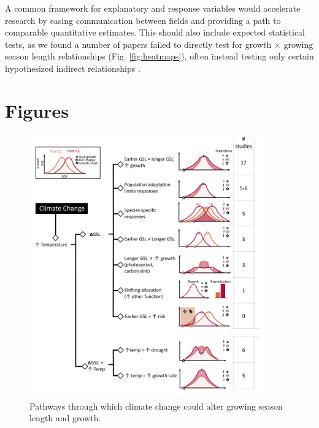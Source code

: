 \documentclass[11pt]{article}
\begin{document}
A common framework for explanatory and response variables would accelerate research by easing communication between fields and providing a path to comparable quantitative estimates. This should also include expected statistical tests, as we found a number of papers failed to directly test for growth $\times$ growing season length relationships (Fig. \ref{fig:heatmaps}), often instead testing only certain hypothesized indirect relationships \citep[e.g. spring temperature $\times$ growth in][]{dow2022warm}. %

\newpage
\section{Figures}


\clearpage
\begin{figure}[h!]
\includegraphics[width=0.9\textwidth]{..//figures/hypothesesconceptfig.png}
\caption{Pathways through which climate change could alter growing season length and growth.} %

\label{fig:hypotheses}
\end{figure}
\end{document}
